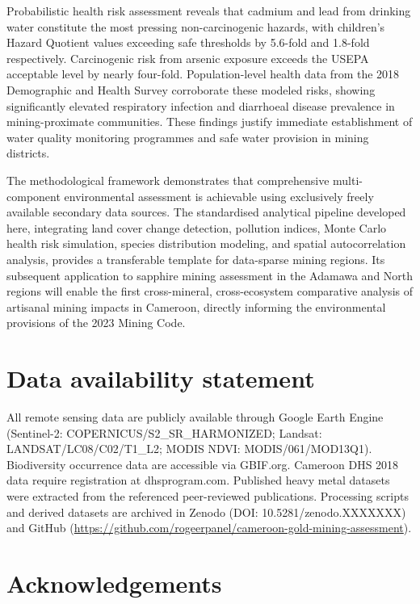\documentclass[preprint,12pt,number]{elsarticle}
\begin{document}
Probabilistic health risk assessment reveals that cadmium and lead from drinking water constitute the most pressing non-carcinogenic hazards, with children's Hazard Quotient values exceeding safe thresholds by 5.6-fold and 1.8-fold respectively. Carcinogenic risk from arsenic exposure exceeds the USEPA acceptable level by nearly four-fold. Population-level health data from the 2018 Demographic and Health Survey corroborate these modeled risks, showing significantly elevated respiratory infection and diarrhoeal disease prevalence in mining-proximate communities. These findings justify immediate establishment of water quality monitoring programmes and safe water provision in mining districts.

The methodological framework demonstrates that comprehensive multi-component environmental assessment is achievable using exclusively freely available secondary data sources. The standardised analytical pipeline developed here, integrating land cover change detection, pollution indices, Monte Carlo health risk simulation, species distribution modeling, and spatial autocorrelation analysis, provides a transferable template for data-sparse mining regions. Its subsequent application to sapphire mining assessment in the Adamawa and North regions will enable the first cross-mineral, cross-ecosystem comparative analysis of artisanal mining impacts in Cameroon, directly informing the environmental provisions of the 2023 Mining Code.


\section*{Data availability statement}

All remote sensing data are publicly available through Google Earth Engine (Sentinel-2: COPERNICUS/S2\_SR\_HARMONIZED; Landsat: LANDSAT/LC08/C02/T1\_L2; MODIS NDVI: MODIS/061/MOD13Q1). Biodiversity occurrence data are accessible via GBIF.org. Cameroon DHS 2018 data require registration at dhsprogram.com. Published heavy metal datasets were extracted from the referenced peer-reviewed publications. Processing scripts and derived datasets are archived in Zenodo (DOI: 10.5281/zenodo.XXXXXXX) and GitHub (\url{https://github.com/rogeerpanel/cameroon-gold-mining-assessment}).


\section*{Acknowledgements}
\end{document}
